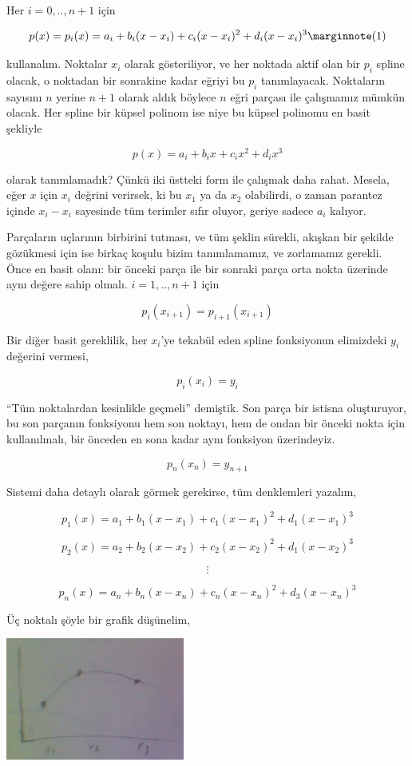 \documentclass[12pt,fleqn]{article}\usepackage{../../common}
\begin{document}
Her $i=0,..,n+1$ için 

$$ p(x) = p_i(x) = a_i + b_i(x-x_i) + c_i(x-x_i)^2 + d_i(x-x_i)^3
\mlabel{1}
$$

kullanalım. Noktalar $x_i$ olarak gösteriliyor, ve her noktada aktif olan
bir $p_i$ spline olacak, o noktadan bir sonrakine kadar eğriyi bu $p_i$
tanımlayacak. Noktaların sayısını $n$ yerine $n+1$ olarak aldık böylece $n$
eğri parçası ile çalışmamız mümkün olacak. Her spline bir küpsel polinom ise
niye bu küpsel polinomu en basit şekliyle

$$ p(x) = a_i + b_ix + c_ix^2 + d_ix^3 $$

olarak tanımlamadık? Çünkü iki üstteki form ile çalışmak daha
rahat. Mesela, eğer $x$ için $x_i$ değrini verirsek, ki bu $x_1$ ya da
$x_2$ olabilirdi, o zaman parantez içinde $x_i - x_i$ sayesinde tüm 
terimler sıfır oluyor, geriye sadece $a_i$ kalıyor. 

Parçaların uçlarının birbirini tutması, ve tüm şeklin sürekli, akışkan bir
şekilde gözükmesi için ise birkaç koşulu bizim tanımlamamız, ve zorlamamız
gerekli. Önce en basit olanı: bir önceki parça ile bir sonraki parça
orta nokta üzerinde aynı değere sahip olmalı. $i=1,..,n+1$ için

$$ p_i (x_{i+1}) = p_{i+1}(x_{i+1}) $$

Bir diğer basit gereklilik, her $x_i$'ye tekabül eden spline fonksiyonun
elimizdeki $y_i$ değerini vermesi,

$$ p_i(x_i) = y_i $$

``Tüm noktalardan kesinlikle geçmeli'' demiştik. Son parça bir istisna
oluşturuyor, bu son parçanın fonksiyonu hem son noktayı, hem de ondan bir
önceki nokta için kullanılmalı, bir önceden en sona kadar aynı fonksiyon
üzerindeyiz. 

$$ p_{n}(x_n) = y_{n+1} $$

Sistemi daha detaylı olarak görmek gerekirse, tüm denklemleri yazalım,

$$ p_1(x)  = a_1 + b_1(x-x_1) + c_1(x-x_1)^2 + d_1(x-x_1)^3$$

$$ p_2(x)  = a_2 + b_2(x-x_2) + c_2(x-x_2)^2 + d_1(x-x_2)^3$$

$$ \vdots $$

$$ p_n(x)  = a_n + b_n(x-x_n) + c_n(x-x_n)^2 + d_3(x-x_n)^3$$

Üç noktalı şöyle bir grafik düşünelim,

\includegraphics[height=4cm]{spline2.png}
\end{document}
